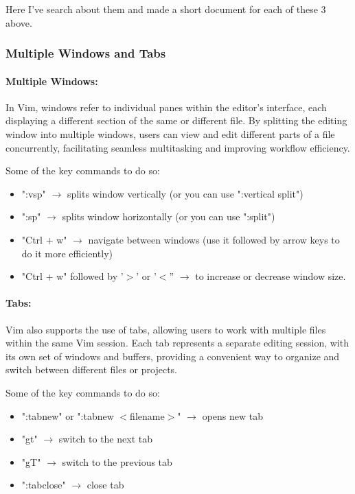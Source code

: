 \documentclass[12pt]{article}
\begin{document}
	Here I've search about them and made a short document for each of these 3 above.

	\subsubsection{Multiple Windows and Tabs}
	\paragraph{Multiple Windows:} In Vim, windows refer to individual panes within the editor's interface, each displaying a different section of the same or different file.
	By splitting the editing window into multiple windows, users can view and edit different parts of a file concurrently, facilitating seamless multitasking and improving workflow efficiency.

	Some of the key commands to do so:
	\begin{itemize}
		\item ":vsp" $\rightarrow$ splits window vertically (or you can use ":vertical split")
		\item ":sp" $\rightarrow$ splits window horizontally (or you can use ":split")
		\item "Ctrl + w" $\rightarrow$ navigate between windows (use it followed by arrow keys to do it more efficiently)
		\item "Ctrl + w" followed by '$>$' or '$<$'' $\rightarrow$ to increase or decrease window size.
	\end{itemize}

	\paragraph{Tabs:} Vim also supports the use of tabs, allowing users to work with multiple files within the same Vim session.
	Each tab represents a separate editing session, with its own set of windows and buffers, providing a convenient way to organize and
	switch between different files or projects.

	Some of the key commands to do so:
	\begin{itemize}
		\item ":tabnew" or ":tabnew $<$filename$>$" $\rightarrow$ opens new tab
		\item "gt" $\rightarrow$ switch to the next tab
		\item "gT" $\rightarrow$ switch to the previous tab
		\item ":tabclose" $\rightarrow$ close tab
	\end{itemize}
\end{document}
